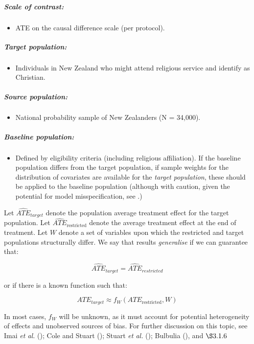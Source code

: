 \documentclass[
  singlecolumn]{article}
\let\oldsubparagraph\subparagraph
\renewcommand{\subparagraph}[1]{\oldsubparagraph{#1}\mbox{}}
\providecommand{\tightlist}{%
  \setlength{\itemsep}{0pt}\setlength{\parskip}{0pt}}\usepackage{longtable,booktabs,array}
\begin{document}
\subparagraph{Scale of contrast:}\label{scale-of-contrast}

\begin{itemize}
\tightlist
\item
  ATE on the causal difference scale (per protocol).
\end{itemize}

\subparagraph{Target population:}\label{target-population}

\begin{itemize}
\tightlist
\item
  Individuals in New Zealand who might attend religious service and
  identify as Christian.
\end{itemize}

\subparagraph{Source population:}\label{source-population}

\begin{itemize}
\tightlist
\item
  National probability sample of New Zealanders (N = 34,000).
\end{itemize}

\subparagraph{Baseline population:}\label{baseline-population}

\begin{itemize}
\tightlist
\item
  Defined by eligibility criteria (including religious affiliation). If
  the baseline population differs from the target population, if sample
  weights for the distribution of covariates are available for the
  \emph{target population}, these should be applied to the baseline
  population (although with caution, given the potential for model
  misspecification, see .)
\end{itemize}

Let \(\widehat{ATE}_{target}\) denote the population average treatment
effect for the target population. Let
\(\widehat{ATE}_{\text{restricted}}\) denote the average treatment
effect at the end of treatment. Let \(W\) denote a set of variables upon
which the restricted and target populations structurally differ. We say
that results \emph{generalise} if we can guarantee that:

\[
\widehat{ATE}_{target} =  \widehat{ATE}_{restricted} 
\]

or if there is a known function such that:

\[
ATE_{target}\approx  f_W(ATE_{\text{restricted}}, W)
\]

In most cases, \(f_W\) will be unknown, as it must account for potential
heterogeneity of effects and unobserved sources of bias. For further
discussion on this topic, see Imai \emph{et al.}
(); Cole and Stuart
(); Stuart \emph{et al.}
(); Bulbulia
(), and \(\S 3.1.6\)
\end{document}

